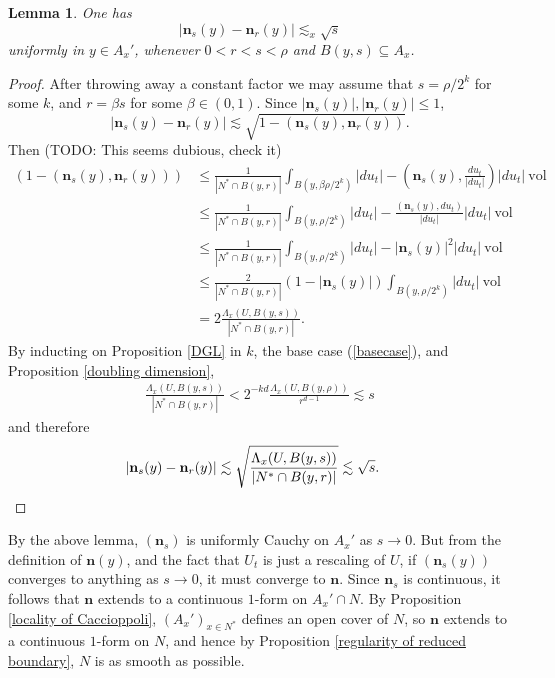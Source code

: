 \documentclass[reqno,12pt,letterpaper]{amsart}
\newcommand{\normal}{\mathbf n}
\newcommand{\vol}{\mathrm{vol}}
\newtheorem{lemma}[theorem]{Lemma}
\theoremstyle{definition}
\numberwithin{equation}{section}
\begin{document}
\begin{lemma}
One has
$$|\normal_s(y) - \normal_r(y)| \lesssim_x \sqrt s$$
uniformly in $y \in A_x'$, whenever $0 < r < s < \rho$ and $B(y, s) \subseteq A_x$.
\end{lemma}
\begin{proof}
After throwing away a constant factor we may assume that $s = \rho/2^k$ for some $k$, and $r = \beta s$ for some $\beta \in (0, 1)$.
Since $|\normal_s(y)|,|\normal_r(y)| \leq 1$,
$$|\normal_s(y) - \normal_r(y)| \lesssim \sqrt{1 - (\normal_s(y), \normal_r(y))}.$$
Then (TODO: This seems dubious, check it)
\begin{align*}
(1 - (\normal_s(y), \normal_r(y)))  &\leq \frac{1}{|N^* \cap B(y, r)|} \int_{B(y, \beta \rho/2^k)} |du_t| - \left(\normal_s(y), \frac{du_t}{|du_t|}\right) |du_t| ~\vol\\
&\leq \frac{1}{|N^* \cap B(y, r)|} \int_{B(y, \rho/2^k)} |du_t| - \frac{(\normal_s(y), du_t)}{|du_t|} |du_t| ~\vol \\
&\leq \frac{1}{|N^* \cap B(y, r)|} \int_{B(y, \rho/2^k)} |du_t| - |\normal_s(y)|^2 |du_t| ~\vol\\
&\leq \frac{2}{|N^* \cap B(y, r)|} (1 - |\normal_s(y)|)\int_{B(y, \rho/2^k)} |du_t| ~\vol\\
&= 2\frac{\Lambda_x(U, B(y, s))}{|N^* \cap B(y, r)|}.
\end{align*}
By inducting on Proposition \ref{DGL} in $k$, the base case (\ref{basecase}), and Proposition \ref{doubling dimension},
\begin{align*}
\frac{\Lambda_x(U, B(y, s))}{|N^* \cap B(y, r)|} < 2^{-kd} \frac{\Lambda_x(U, B(y, \rho))}{r^{d - 1}} \lesssim s
\end{align*}
and therefore
\begin{align*}
|\normal_s(y) - \normal_r(y)| &\lesssim \sqrt{\frac{\Lambda_x(U, B(y, s))}{|N^* \cap B(y, r)|}} \lesssim \sqrt s. \qedhere
\end{align*}
\end{proof}

By the above lemma, $(\normal_s)$ is uniformly Cauchy on $A_x'$ as $s \to 0$.
But from the definition of $\normal(y)$, and the fact that $U_t$ is just a rescaling of $U$, if $(\normal_s(y))$ converges to anything as $s \to 0$, it must converge to $\normal$.
Since $\normal_s$ is continuous, it follows that $\normal$ extends to a continuous $1$-form on $A_x' \cap N$.
By Proposition \ref{locality of Caccioppoli}, $(A_x')_{x \in N^*}$ defines an open cover of $N$, so $\normal$ extends to a continuous $1$-form on $N$, and hence by Proposition \ref{regularity of reduced boundary}, $N$ is as smooth as possible.
\end{document}
